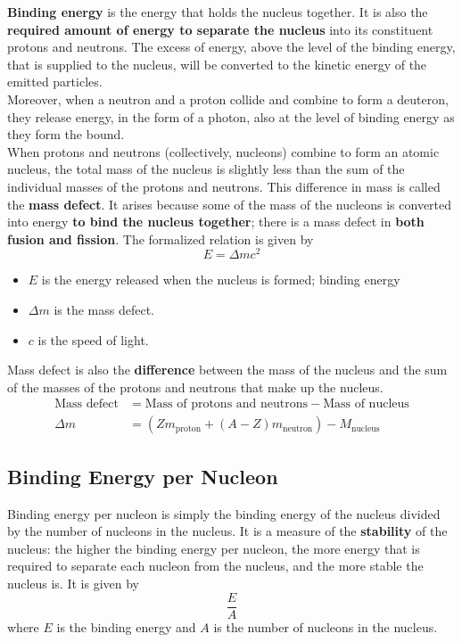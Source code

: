 \documentclass[a4paper,12pt]{article}
\newcommand{\lb}{\\[8pt]}
\begin{document}
\textbf{Binding energy} is the energy that holds the nucleus together. It is also the \textbf{required amount of energy to separate the nucleus} into its constituent protons and neutrons. The excess of energy, above the level of the binding energy, that is supplied to the nucleus, will be converted to the kinetic energy of the emitted particles.\lb
Moreover, when a neutron and a proton collide and combine to form a deuteron, they release energy, in the form of a photon, also at the level of binding energy as they form the bound.\lb
When protons and neutrons (collectively, nucleons) combine to form an atomic nucleus, the total mass of the nucleus is slightly less than the sum of the individual masses of the protons and neutrons. This difference in mass is called the \textbf{mass defect}. It arises because some of the mass of the nucleons is converted into energy \textbf{to bind the nucleus together}; there is a mass defect in \textbf{both fusion and fission}. The formalized relation is given by
$$E = \Delta mc^2$$
\begin{itemize}
  \item $E$ is the energy released when the nucleus is formed; binding energy
  \item $\Delta m$ is the mass defect.
  \item $c$ is the speed of light.
\end{itemize}
Mass defect is also the \textbf{difference} between the mass of the nucleus and the sum of the masses of the protons and neutrons that make up the nucleus.
\begin{align*}
  \text{Mass defect} & = \text{Mass of protons and neutrons} - \text{Mass of nucleus}             \\
  \Delta m           & = \left(Zm_\text{proton} + (A-Z)m_\text{neutron}\right) - M_\text{nucleus}
\end{align*}

\pagebreak

\subsection{Binding Energy per Nucleon}

Binding energy per nucleon is simply the binding energy of the nucleus divided by the number of nucleons in the nucleus. It is a measure of the \textbf{stability} of the nucleus: the higher the binding energy per nucleon, the more energy that is required to separate each nucleon from the nucleus, and the more stable the nucleus is. It is given by
$$\frac{E}{A}$$
where $E$ is the binding energy and $A$ is the number of nucleons in the nucleus.
\end{document}
